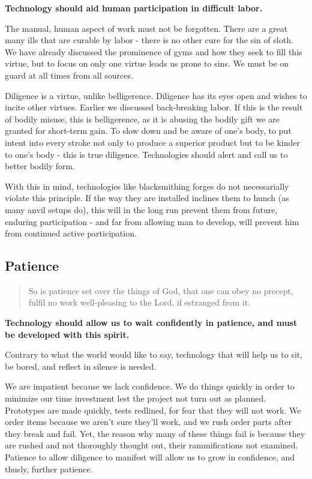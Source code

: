 \documentclass[letterpaper]{article}
\begin{document}
\textbf{Technology should aid human participation in difficult labor.}

The manual, human aspect of work must not be forgotten. There are a great many ills that are curable by labor - there is no other cure for the sin of sloth. We have already discussed the prominence of gyms and how they seek to fill this virtue, but to focus on only one virtue leads us prone to sins. We must be on guard at all times from all sources.

Diligence is a virtue, unlike belligerence. Diligence has its eyes open and wishes to incite other virtues. Earlier we discussed back-breaking labor. If this is the result of bodily misuse, this is belligerence, as it is abusing the bodily gift we are granted for short-term gain. To slow down and be aware of one's body, to put intent into every stroke not only to produce a superior product but to be kinder to one's body - this is true diligence. Technologies should alert and call us to better bodily form.

With this in mind, technologies like blacksmithing forges do not necessarially violate this principle. If the way they are installed inclines them to hunch (as many anvil setups do), this will in the long run prevent them from future, enduring participation - and far from allowing man to develop, will prevent him from continued active participation.

\subsection{Patience}

\begin{quote}
  So is patience set over the things of God, that one can obey no precept, fulfil no work well-pleasing to the Lord, if estranged from it.
\end{quote}

\textbf{Technology should allow us to wait confidently in patience, and must be developed with this spirit.}

Contrary to what the world would like to say, technology that will help us to sit, be bored, and reflect in silence is needed.

We are impatient because we lack confidence. We do things quickly in order to minimize our time investment lest the project not turn out as planned. Prototypes are made quickly, tests redlined, for fear that they will not work. We order items because we aren't sure they'll work, and we rush order parts after they break and fail. Yet, the reason why many of these things fail is because they are rushed and not thoroughly thought out, their rammifications not examined. Patience to allow diligence to manifest will allow us to grow in confidence, and thusly, further patience.
\end{document}
